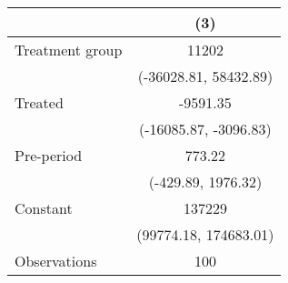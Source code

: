 \begin{tabular}{lc}
\toprule
{} &                    (3) \\
\midrule
Treatment group &                  11202 \\
                &  (-36028.81, 58432.89) \\
Treated         &               -9591.35 \\
                &  (-16085.87, -3096.83) \\
Pre-period      &                 773.22 \\
                &     (-429.89, 1976.32) \\
Constant        &                 137229 \\
                &  (99774.18, 174683.01) \\
Observations    &                    100 \\
\bottomrule
\end{tabular}
